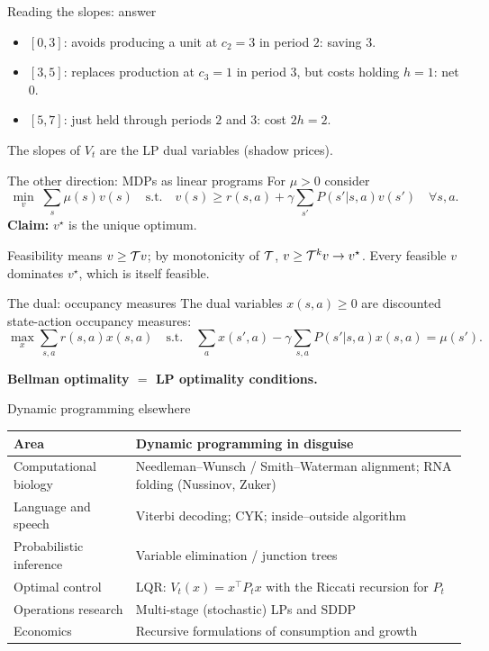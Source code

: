 \begin{frame}{Reading the slopes: answer}
	\begin{itemize}
		\item $[0,3]$: avoids producing a unit at $c_2=3$ in period $2$: saving $3$.
		\item $[3,5]$: replaces production at $c_3=1$ in period $3$, but costs holding $h=1$: net $0$.
		\item $[5,7]$: just held through periods $2$ and $3$: cost $2h=2$.
	\end{itemize}

	\seprule

	The slopes of $V_t$ are the LP \alert{dual variables} (shadow prices).
\end{frame}

\begin{frame}{The other direction: MDPs as linear programs}
	For $\mu>0$ consider
	\[
		\min_v\;\sum_s\mu(s)v(s)\quad\text{s.t.}\quad v(s)\ge r(s,a)+\gamma\sum_{s'}P(s'|s,a)v(s')\quad\forall s,a.
	\]
	\textbf{Claim:} $v^\star$ is the unique optimum.

	\vspace{0.5em}
	Feasibility means $v\ge\mathcal{T} v$; by monotonicity of $\mathcal{T}$,
	$v\ge\mathcal{T}^kv\to v^\star$. Every feasible $v$ dominates $v^\star$, which is itself feasible.
\end{frame}

\begin{frame}{The dual: occupancy measures}
	The dual variables $x(s,a)\ge0$ are \alert{discounted state-action occupancy measures}:
	\[
		\max_x\sum_{s,a}r(s,a)x(s,a)\quad\text{s.t.}\quad\sum_ax(s',a)-\gamma\sum_{s,a}P(s'|s,a)x(s,a)=\mu(s').
	\]

	\seprule

	\textbf{Bellman optimality $=$ LP optimality conditions.}
\end{frame}

\begin{frame}{Dynamic programming elsewhere}
	\small
	\begin{center}
		\renewcommand{\arraystretch}{1.25}
		\begin{tabularx}{\textwidth}{@{}lX@{}}
			\toprule
			Area & Dynamic programming in disguise\\
			\midrule
			Computational biology & Needleman--Wunsch / Smith--Waterman alignment; RNA folding (Nussinov, Zuker)\\
			Language and speech & Viterbi decoding; CYK; inside--outside algorithm\\
			Probabilistic inference & Variable elimination / junction trees\\
			Optimal control & LQR: $V_t(x)=x^\top P_tx$ with the Riccati recursion for $P_t$\\
			Operations research & Multi-stage (stochastic) LPs and SDDP\\
			Economics & Recursive formulations of consumption and growth\\
			\bottomrule
		\end{tabularx}
	\end{center}
\end{frame}

